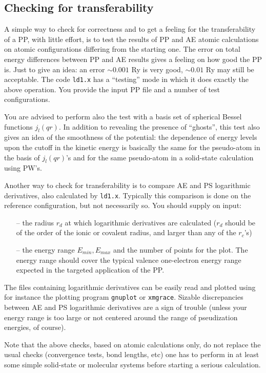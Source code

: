 \documentclass[12pt]{article}
\begin{document}
\subsection{Checking for transferability}
\label{trans}
A simple way to check for correctness and to get a feeling for 
the transferability of a PP, with little effort, is to test the 
results of PP and AE atomic calculations on atomic configurations 
differing from the starting one. The error on total energy 
differences between PP and AE results gives a feeling on how 
good the PP is. Just to give an idea: an error $\sim 0.001$ Ry 
is very good, $\sim 0.01$ Ry may still be acceptable.
The code \texttt{ld1.x} has a ``testing'' mode in which it does
exactly the above operation. You provide the input PP file and
a number of test configurations.

You are advised to perform also the test with a basis set of spherical
Bessel functions $j_l (qr)$. In addition to revealing the presence of
``ghosts'', this test also gives an idea of the smoothness of the 
potential: the dependence of energy levels upon the cutoff in the kinetic 
energy is basically the same for the pseudo-atom in the basis of $j_l (qr)$'s
and for the same pseudo-atom in a solid-state calculation using PW's.

Another way to check for transferability is to compare AE and PS 
logarithmic derivatives, also calculated by \texttt{ld1.x}. Typically 
this comparison is done on the reference configuration,
but not necessarily so. You should supply on input:
\begin{enumerate}
\item[--] the radius $r_d$ at which logarithmic derivatives are 
          calculated ($r_d$ should be of the order of the
          ionic or covalent radius, and larger than any of the $r_c$'s)
\item[--] the energy range $E_{min}, E_{max}$ and the number 
          of points for the plot. The energy range
          should cover the typical valence one-electron energy 
          range expected in the targeted application of the PP. 
\end{enumerate}
The files containing logarithmic derivatives can be easily read and 
plotted using for instance the plotting program \texttt{gnuplot} 
or \texttt{xmgrace}. 
Sizable discrepancies between AE and PS logarithmic derivatives 
are a sign of trouble (unless your energy range is too large or 
not centered around the range of pseudization energies, of course).

Note that the above checks, based on atomic calculations only,
do not replace the usual checks (convergence tests, bond lengths,
etc) one has to perform in at least some simple solid-state or 
molecular systems before starting a serious calculation.
\end{document}
